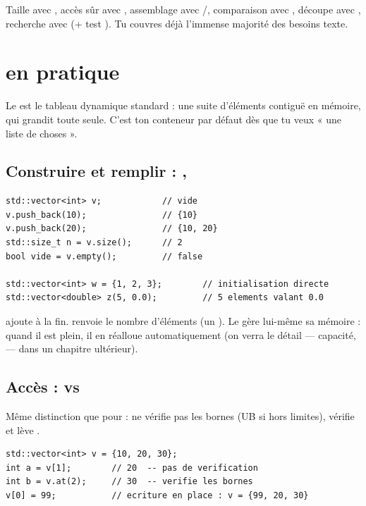\documentclass[11pt]{article}
\begin{document}
\begin{aretenir}
Taille avec , accès sûr avec , assemblage avec
\code{+}/\code{+=}, comparaison avec \code{==}, découpe avec ,
recherche avec  (+ test ). Tu couvres déjà l'immense
majorité des besoins texte.
\end{aretenir}

\section{ en pratique}

Le  est le tableau dynamique standard : une suite d'éléments
contiguë en mémoire, qui grandit toute seule. C'est ton conteneur par défaut
dès que tu veux « une liste de choses ».

\subsection*{Construire et remplir : , }

\begin{lstlisting}
std::vector<int> v;            // vide
v.push_back(10);               // {10}
v.push_back(20);               // {10, 20}
std::size_t n = v.size();      // 2
bool vide = v.empty();         // false

std::vector<int> w = {1, 2, 3};        // initialisation directe
std::vector<double> z(5, 0.0);         // 5 elements valant 0.0
\end{lstlisting}

 ajoute  à la fin.  renvoie le nombre
d'éléments (un ). Le  gère lui-même sa mémoire :
quand il est plein, il en réalloue automatiquement (on verra le détail
— capacité,  — dans un chapitre ultérieur).

\subsection*{Accès : \code{[]} vs }

Même distinction que pour  : \code{[]} ne vérifie pas les
bornes (UB si hors limites),  vérifie et lève
.

\begin{lstlisting}
std::vector<int> v = {10, 20, 30};
int a = v[1];        // 20  -- pas de verification
int b = v.at(2);     // 30  -- verifie les bornes
v[0] = 99;           // ecriture en place : v = {99, 20, 30}
\end{lstlisting}
\end{document}
